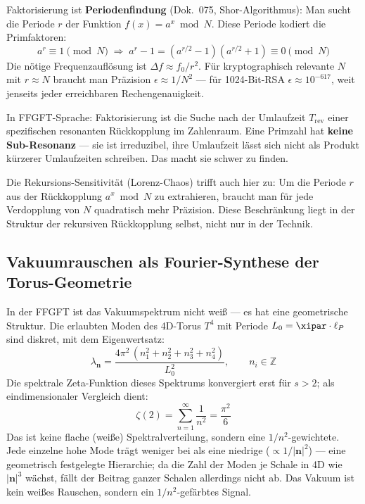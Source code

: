 \begin{technical}
Faktorisierung ist \textbf{Periodenfindung} (Dok.~075, Shor-Algorithmus): Man sucht
die Periode $r$ der Funktion $f(x) = a^x \bmod N$. Diese Periode kodiert die
Primfaktoren:
\begin{equation}
    a^r \equiv 1 \pmod{N}
    \;\Rightarrow\;
    a^r - 1 = (a^{r/2}-1)(a^{r/2}+1) \equiv 0 \pmod{N}
\end{equation}
Die nötige Frequenzauflösung ist $\Delta f \approx f_0/r^2$. Für kryptographisch
relevante $N$ mit $r \approx N$ braucht man Präzision $\epsilon \approx 1/N^2$ —
für 1024-Bit-RSA $\epsilon \approx 10^{-617}$, weit jenseits jeder erreichbaren
Rechengenauigkeit.

In FFGFT-Sprache: Faktorisierung ist die Suche nach der Umlaufzeit $T_\text{rev}$
einer spezifischen resonanten Rückkopplung im Zahlenraum. Eine Primzahl hat
\textbf{keine Sub-Resonanz} — sie ist irreduzibel, ihre Umlaufzeit lässt sich
nicht als Produkt kürzerer Umlaufzeiten schreiben. Das macht sie schwer zu finden.

Die Rekursions-Sensitivität (Lorenz-Chaos) trifft auch hier zu: Um die Periode
$r$ aus der Rückkopplung $a^x \bmod N$ zu extrahieren, braucht man für jede
Verdopplung von $N$ quadratisch mehr Präzision. Diese Beschränkung
liegt in der Struktur der rekursiven Rückkopplung selbst, nicht nur in der Technik.
\end{technical}


\subsection{Vakuumrauschen als Fourier-Synthese der Torus-Geometrie}

In der FFGFT ist das Vakuumspektrum nicht weiß — es hat eine geometrische Struktur.
Die erlaubten Moden des 4D-Torus $T^4$ mit Periode $L_0 = \xipar \cdot \ell_P$ sind
diskret, mit dem Eigenwertsatz:
\begin{equation}
    \lambda_\mathbf{n} = \frac{4\pi^2\,(n_1^2 + n_2^2 + n_3^2 + n_4^2)}{L_0^2},
    \qquad n_i \in \mathbb{Z}
\end{equation}
Die spektrale Zeta-Funktion dieses Spektrums konvergiert erst für $s > 2$;
als eindimensionaler Vergleich dient:
\begin{equation}
    \zeta(2) = \sum_{n=1}^{\infty} \frac{1}{n^2} = \frac{\pi^2}{6}
\end{equation}
Das ist keine flache (weiße) Spektralverteilung, sondern eine $1/n^2$-gewichtete.
Jede einzelne hohe Mode trägt weniger bei als eine niedrige ($\propto 1/|\mathbf{n}|^2$) — eine geometrisch festgelegte
Hierarchie; da die Zahl der Moden je Schale in 4D wie $|\mathbf{n}|^3$ wächst, fällt der Beitrag ganzer Schalen allerdings nicht ab.
Das Vakuum ist kein weißes Rauschen, sondern ein $1/n^2$-gefärbtes Signal.

